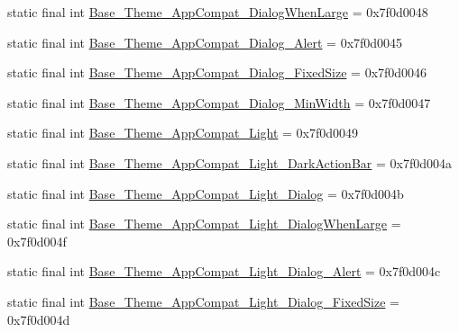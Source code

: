 \begin{DoxyCompactItemize}
\item 
static final int \mbox{\hyperlink{classandroid_1_1support_1_1v7_1_1appcompat_1_1R_1_1style_ab3c5904aaf094fea489a96fd27d27f5c}{Base\+\_\+\+Theme\+\_\+\+App\+Compat\+\_\+\+Dialog\+When\+Large}} = 0x7f0d0048
\item 
static final int \mbox{\hyperlink{classandroid_1_1support_1_1v7_1_1appcompat_1_1R_1_1style_ada2c22dc6fb4c92d077cd4a02d43b80f}{Base\+\_\+\+Theme\+\_\+\+App\+Compat\+\_\+\+Dialog\+\_\+\+Alert}} = 0x7f0d0045
\item 
static final int \mbox{\hyperlink{classandroid_1_1support_1_1v7_1_1appcompat_1_1R_1_1style_a3072b639ca4d5edf5804977ebeb2d49e}{Base\+\_\+\+Theme\+\_\+\+App\+Compat\+\_\+\+Dialog\+\_\+\+Fixed\+Size}} = 0x7f0d0046
\item 
static final int \mbox{\hyperlink{classandroid_1_1support_1_1v7_1_1appcompat_1_1R_1_1style_a6c7bf430cec7ead4856c4bd105b372f7}{Base\+\_\+\+Theme\+\_\+\+App\+Compat\+\_\+\+Dialog\+\_\+\+Min\+Width}} = 0x7f0d0047
\item 
static final int \mbox{\hyperlink{classandroid_1_1support_1_1v7_1_1appcompat_1_1R_1_1style_a21221b90b140d668d6828375f531bd0e}{Base\+\_\+\+Theme\+\_\+\+App\+Compat\+\_\+\+Light}} = 0x7f0d0049
\item 
static final int \mbox{\hyperlink{classandroid_1_1support_1_1v7_1_1appcompat_1_1R_1_1style_a8a1bcb0c15999d6dc1bb8982c227409f}{Base\+\_\+\+Theme\+\_\+\+App\+Compat\+\_\+\+Light\+\_\+\+Dark\+Action\+Bar}} = 0x7f0d004a
\item 
static final int \mbox{\hyperlink{classandroid_1_1support_1_1v7_1_1appcompat_1_1R_1_1style_afdae1fc80f953e632283e11338b1d9ef}{Base\+\_\+\+Theme\+\_\+\+App\+Compat\+\_\+\+Light\+\_\+\+Dialog}} = 0x7f0d004b
\item 
static final int \mbox{\hyperlink{classandroid_1_1support_1_1v7_1_1appcompat_1_1R_1_1style_aac096fa4a63eb07be4009ae6325785ac}{Base\+\_\+\+Theme\+\_\+\+App\+Compat\+\_\+\+Light\+\_\+\+Dialog\+When\+Large}} = 0x7f0d004f
\item 
static final int \mbox{\hyperlink{classandroid_1_1support_1_1v7_1_1appcompat_1_1R_1_1style_acde9422ae8c11ea0144daceddb2885f8}{Base\+\_\+\+Theme\+\_\+\+App\+Compat\+\_\+\+Light\+\_\+\+Dialog\+\_\+\+Alert}} = 0x7f0d004c
\item 
static final int \mbox{\hyperlink{classandroid_1_1support_1_1v7_1_1appcompat_1_1R_1_1style_a5f39b1dc9c0baf075c95d9ad78ebcb5f}{Base\+\_\+\+Theme\+\_\+\+App\+Compat\+\_\+\+Light\+\_\+\+Dialog\+\_\+\+Fixed\+Size}} = 0x7f0d004d
\item 

\end{DoxyCompactItemize}
